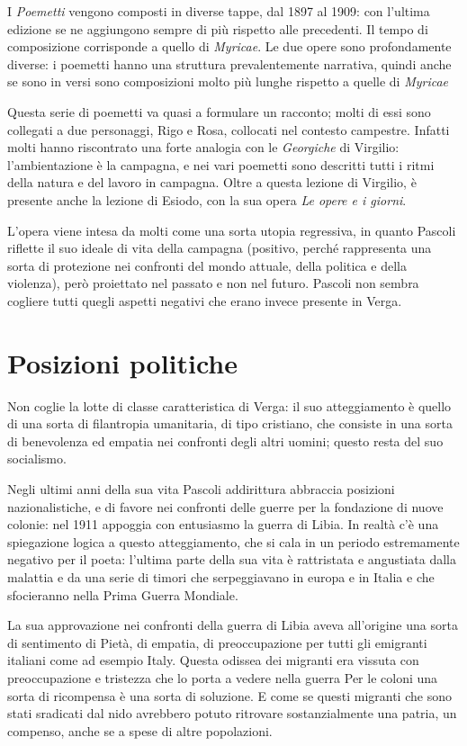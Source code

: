 \documentclass[a4paper, twoside, titlepage]{book}
\begin{document}
I \textit{Poemetti} vengono composti in diverse tappe, dal 1897 al 1909: con l'ultima edizione se ne aggiungono sempre di più rispetto alle precedenti.
Il tempo di composizione corrisponde a quello di \textit{Myricae}.
Le due opere sono profondamente diverse: i poemetti hanno una struttura prevalentemente narrativa, quindi anche se sono in versi sono composizioni molto più lunghe rispetto a quelle di \textit{Myricae}

Questa serie di poemetti va quasi a formulare un racconto; molti di essi sono collegati a due personaggi, Rigo e Rosa, collocati nel contesto campestre.
Infatti molti hanno riscontrato una forte analogia con le \textit{Georgiche} di Virgilio: l'ambientazione è la campagna, e nei vari poemetti sono descritti tutti i ritmi della natura e del lavoro in campagna. Oltre a questa lezione di Virgilio, è presente anche la lezione di Esiodo, con la sua opera \textit{Le opere e i giorni}.

L'opera viene intesa da molti come una sorta utopia regressiva, in quanto Pascoli riflette il suo ideale di vita della campagna (positivo, perché rappresenta una sorta di protezione nei confronti del mondo attuale, della politica e della violenza), però proiettato nel passato e non nel futuro. Pascoli non sembra cogliere tutti quegli aspetti negativi che erano invece presente in Verga.

\section{Posizioni politiche}

Non coglie la lotte di classe caratteristica di Verga: il suo atteggiamento è quello di una sorta di filantropia umanitaria, di tipo cristiano, che consiste in una sorta di benevolenza ed empatia nei confronti degli altri uomini; questo resta del suo socialismo.

Negli ultimi anni della sua vita Pascoli addirittura abbraccia posizioni nazionalistiche, e di favore nei confronti delle guerre per la fondazione di nuove colonie: nel 1911 appoggia con entusiasmo la guerra di Libia. In realtà c'è una spiegazione logica a questo atteggiamento, che si cala in un periodo estremamente negativo per il poeta: l'ultima parte della sua vita è rattristata e angustiata dalla malattia e da una serie di timori che serpeggiavano in europa e in Italia e che sfocieranno nella Prima Guerra Mondiale.

La sua approvazione nei confronti della guerra di Libia aveva all'origine una sorta di sentimento di Pietà, di empatia, di preoccupazione per tutti gli emigranti italiani come ad esempio Italy. Questa odissea dei migranti era vissuta con preoccupazione e tristezza che lo porta a vedere nella guerra Per le coloni una sorta di ricompensa è una sorta di soluzione. E come se questi migranti che sono stati sradicati dal nido avrebbero potuto ritrovare sostanzialmente una patria, un compenso, anche se a spese di altre popolazioni.
\end{document}
